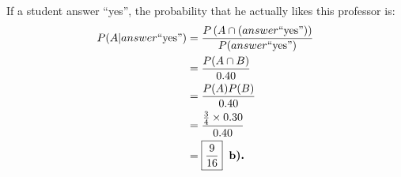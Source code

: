 \documentclass[a4paper, 10pt]{article}
\begin{document}
\begin{tosubmit}
	If a student answer ``yes'', the probability that he actually likes this professor is:
	\begin{align*}
		P(A|answer \text{``yes''}) & = \frac{P\left(A \cap \left(answer \text{``yes''}\right)\right)}{P(answer \text{``yes''})} \\
		                           & = \frac{P(A \cap B)}{0.40}                                                       \\
		                           & = \frac{P(A)P(B)}{0.40}                                                          \\
		                           & = \frac{\frac{3}{4} \times 0.30}{0.40}                                           \\
		                           & = \boxed{\frac{9}{16}} \textbf{\, b).}
	\end{align*}
\end{tosubmit}
\end{document}
